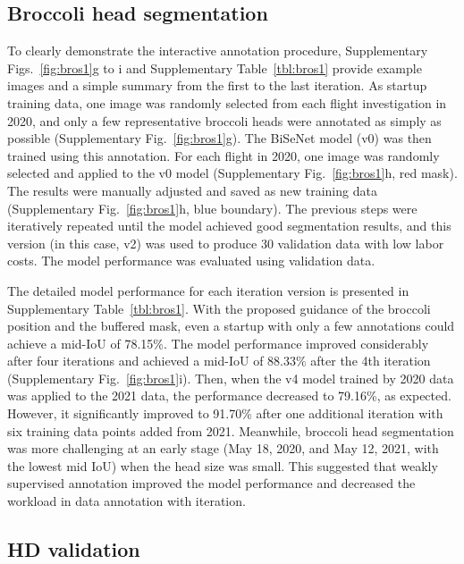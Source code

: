 \subsection{Broccoli head segmentation}

To clearly demonstrate the interactive annotation procedure, Supplementary \linebreak Figs.~\ref{fig:bros1}g to i and Supplementary Table~\ref{tbl:bros1} provide example images and a simple summary from the first to the last iteration. As startup training data, one image was randomly selected from each flight investigation in 2020, and only a few representative broccoli heads were annotated as simply as possible (Supplementary Fig.~\ref{fig:bros1}g). The BiSeNet model (v0) was then trained using this annotation. For each flight in 2020, one image was randomly selected and applied to the v0 model (Supplementary Fig.~\ref{fig:bros1}h, red mask). The results were manually adjusted and saved as new training data (Supplementary Fig.~\ref{fig:bros1}h, blue boundary). The previous steps were iteratively repeated until the model achieved good segmentation results, and this version (in this case, v2) was used to produce 30 validation data with low labor costs. The model performance was evaluated using validation data.

The detailed model performance for each iteration version is presented in Supplementary Table~\ref{tbl:bros1}. With the proposed guidance of the broccoli position and the buffered mask, even a startup with only a few annotations could achieve a mid-IoU of 78.15\%. The model performance improved considerably after four iterations and achieved a mid-IoU of 88.33\% after the 4th iteration (Supplementary Fig.~\ref{fig:bros1}i). Then, when the v4 model trained by 2020 data was applied to the 2021 data, the performance decreased to 79.16\%, as expected. However, it significantly improved to 91.70\% after one additional iteration with six training data points added from 2021. Meanwhile, broccoli head segmentation was more challenging at an early stage (May 18, 2020, and May 12, 2021, with the lowest mid IoU) when the head size was small. This suggested that weakly supervised annotation improved the model performance and decreased the workload in data annotation with iteration.

\subsection{HD validation}

